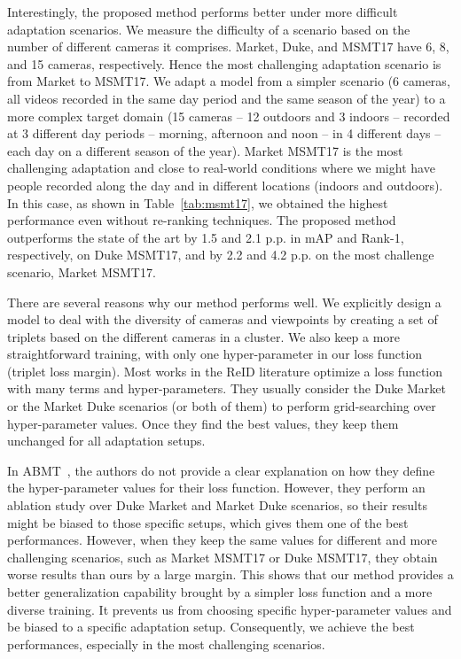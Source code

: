 \documentclass[journal]{IEEEtran}
\begin{document}
Interestingly, the proposed method performs better under more difficult adaptation scenarios. We measure the difficulty of a scenario based on the number of different cameras it comprises. Market, Duke, and MSMT17 have 6, 8, and 15 cameras, respectively. Hence the most challenging adaptation scenario is from Market to MSMT17. We adapt a model from a simpler scenario (6 cameras, all videos recorded in the same day period and the same season of the year) to a more complex target domain (15 cameras -- 12 outdoors and 3 indoors -- recorded at 3 different day periods -- morning, afternoon and noon -- in 4 different days -- each day on a different season of the year). Market  MSMT17 is the most challenging adaptation and close to real-world conditions where we might have people recorded along the day and in different locations (indoors and outdoors). In this case, as shown in Table~\ref{tab:msmt17}, we obtained the highest performance even without re-ranking techniques. The proposed method outperforms the state of the art by 1.5 and 2.1 p.p. in mAP and Rank-1, respectively, on Duke  MSMT17, and by 2.2 and 4.2 p.p. on the most challenge scenario, Market  MSMT17.

There are several reasons why our method performs well. We explicitly design a model to deal with the diversity of cameras and viewpoints by creating a set of triplets based on the different cameras in a cluster. We also keep a more straightforward training, with only one hyper-parameter in our loss function (triplet loss margin). Most works in the ReID literature optimize a loss function with many terms and hyper-parameters. They usually consider the Duke  Market or the Market  Duke scenarios (or both of them) to perform grid-searching over hyper-parameter values. Once they find the best values, they keep them unchanged for all adaptation setups. 

In ABMT~\cite{chen2020enhancing}, the authors do not provide a clear explanation on how they define the hyper-parameter values for their loss function. However, they perform an ablation study over Duke  Market and Market  Duke scenarios, so their results might be biased to those specific setups, which gives them one of the best performances. However, when they keep the same values for different and more challenging scenarios, such as Market  MSMT17 or Duke  MSMT17, they obtain worse results than ours by a large margin. This shows that our method provides a better generalization capability brought by a simpler loss function and a more diverse training. It prevents us from choosing specific hyper-parameter values and be biased to a specific adaptation setup. Consequently, we achieve the best performances, especially in the most challenging scenarios. 
\end{document}
